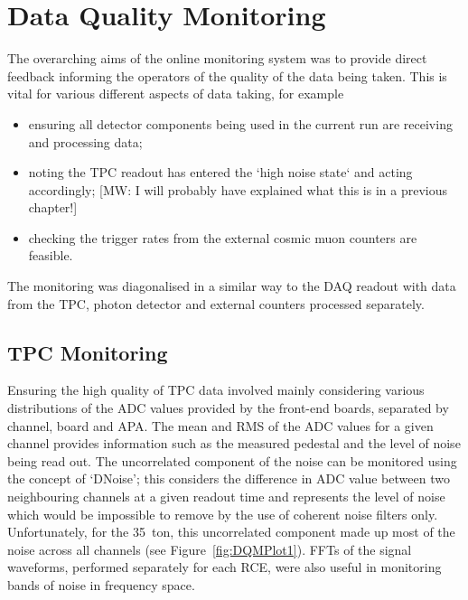 \section{Data Quality Monitoring}\label{sec:DQM}

The overarching aims of the online monitoring system was to provide direct feedback informing the operators of the quality of the data being taken.  This is vital for various different aspects of data taking, for example
\begin{itemize}
\item ensuring all detector components being used in the current run are receiving and processing data;
\item noting the TPC readout has entered the `high noise state` and acting accordingly; [MW: I will probably have explained what this is in a previous chapter!]
\item checking the trigger rates from the external cosmic muon counters are feasible.
\end{itemize}

The monitoring was diagonalised in a similar way to the DAQ readout with data from the TPC, photon detector and external counters processed separately.

\subsection{TPC Monitoring}\label{sec:TPCMonitoring}

Ensuring the high quality of TPC data involved mainly considering various distributions of the ADC values provided by the front-end boards, separated by channel, board and APA.  The mean and RMS of the ADC values for a given channel provides information such as the measured pedestal and the level of noise being read out.  The uncorrelated component of the noise can be monitored using the concept of `DNoise'; this considers the difference in ADC value between two neighbouring channels at a given readout time and represents the level of noise which would be impossible to remove by the use of coherent noise filters only.  Unfortunately, for the 35~ton, this uncorrelated component made up most of the noise across all channels (see Figure~\ref{fig:DQMPlot1}).  FFTs of the signal waveforms, performed separately for each RCE, were also useful in monitoring bands of noise in frequency space.

